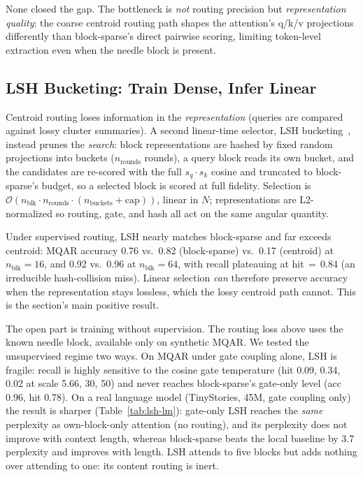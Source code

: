 \documentclass[10pt,letterpaper]{article}
\newcommand{\Ocomplex}{\mathcal{O}}
\begin{document}
None closed the gap. The bottleneck is \emph{not} routing precision but
\emph{representation quality}: the coarse centroid routing path shapes the
attention's q/k/v projections differently than block-sparse's direct pairwise
scoring, limiting token-level extraction even when the needle block is present.

\subsection{LSH Bucketing: Train Dense, Infer Linear}
\label{sec:lsh}

Centroid routing loses information in the \emph{representation} (queries are
compared against lossy cluster summaries). A second linear-time selector, LSH
bucketing~\cite{kitaev2020reformer}, instead prunes the \emph{search}: block representations are hashed by
fixed random projections into buckets ($n_{\text{rounds}}$ rounds), a query
block reads its own bucket, and the candidates are re-scored with the full
$s_q \cdot s_k$ cosine and truncated to block-sparse's budget, so a selected
block is scored at full fidelity. Selection is
$\Ocomplex(n_{\text{blk}} \cdot n_{\text{rounds}} \cdot (n_{\text{buckets}}{+}\text{cap}))$,
linear in $N$; representations are L2-normalized so routing, gate, and hash all
act on the same angular quantity.

Under supervised routing, LSH nearly matches block-sparse and far exceeds
centroid: MQAR accuracy 0.76 vs.\ 0.82 (block-sparse) vs.\ 0.17 (centroid) at
$n_{\text{blk}}{=}16$, and 0.92 vs.\ 0.96 at $n_{\text{blk}}{=}64$, with recall
plateauing at hit$\,{=}\,$0.84 (an irreducible hash-collision miss). Linear
selection \emph{can} therefore preserve accuracy when the representation stays
lossless, which the lossy centroid path cannot. This is the section's main
positive result.

The open part is training without supervision. The routing loss above uses the
known needle block, available only on synthetic MQAR. We tested the unsupervised
regime two ways. On MQAR under gate coupling alone, LSH is fragile: recall is
highly sensitive to the cosine gate temperature (hit 0.09, 0.34, 0.02 at scale
5.66, 30, 50) and never reaches block-sparse's gate-only level (acc 0.96, hit
0.78). On a real language model (TinyStories, 45M, gate coupling only) the result
is sharper (Table~\ref{tab:lsh-lm}): gate-only LSH reaches the \emph{same}
perplexity as own-block-only attention (no routing), and its perplexity does not
improve with context length, whereas block-sparse beats the local baseline by
3.7 perplexity and improves with length. LSH attends to five blocks but adds
nothing over attending to one: its content routing is inert.
\end{document}
